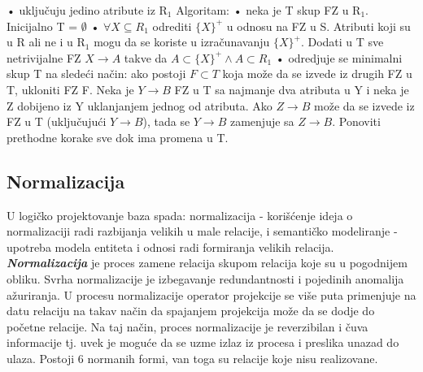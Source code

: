 \documentclass{article}
\begin{document}
\newline \hspace*{0.4cm}• uključuju jedino atribute iz R$_1$
\newline Algoritam:
\newline \hspace*{0.4cm}• neka je T skup FZ u R$_1$. Inicijalno T =
$\emptyset$
\newline \hspace*{0.4cm}• $\forall X \subseteq R_1$ odrediti
$\{X\}^+$ u odnosu na FZ u S. Atributi koji su u R ali ne i u R$_1$
mogu da se koriste u izračunavanju $\{X\}^+$. Dodati u T sve
netrivijalne FZ $X \rightarrow A$ takve da $A \subset \{X\}^+ \wedge
A \subset R_1$
\newline \hspace*{0.4cm}• odredjuje se minimalni skup T na sledeći
način: ako postoji $F \subset T$ koja može da se izvede iz drugih FZ
u T, ukloniti FZ F. Neka je $Y \rightarrow B$ FZ u T sa najmanje dva
atributa u Y i neka je Z dobijeno iz Y uklanjanjem jednog od
atributa. Ako $Z \rightarrow B$ može da se izvede iz FZ u T
(uključujući $Y \rightarrow B$), tada se $Y \rightarrow B$ zamenjuje
sa $Z \rightarrow B$. Ponoviti prethodne korake sve dok ima promena u
T. 

\subsection{Normalizacija}
U logičko projektovanje baza spada: normalizacija -
korišćenje ideja o normalizaciji radi razbijanja velikih u
male relacije, i semantičko modeliranje - upotreba modela
entiteta i odnosi radi formiranja velikih relacija.
\newline
\textit{\textbf{Normalizacija}} je proces zamene relacija
skupom relacija koje su u pogodnijem obliku. Svrha
normalizacije je izbegavanje redundantnosti i pojedinih
anomalija ažuriranja. U procesu normalizacije operator
projekcije se više puta primenjuje na datu relaciju na takav
način da spajanjem projekcija može da se dodje do početne
relacije. Na taj način, proces normalizacije je reverzibilan
i čuva informacije tj. uvek je moguće da se uzme izlaz iz
procesa i preslika unazad do ulaza. Postoji 6 normanih formi, van toga su relacije koje nisu realizovane.
\newpage
\end{document}
